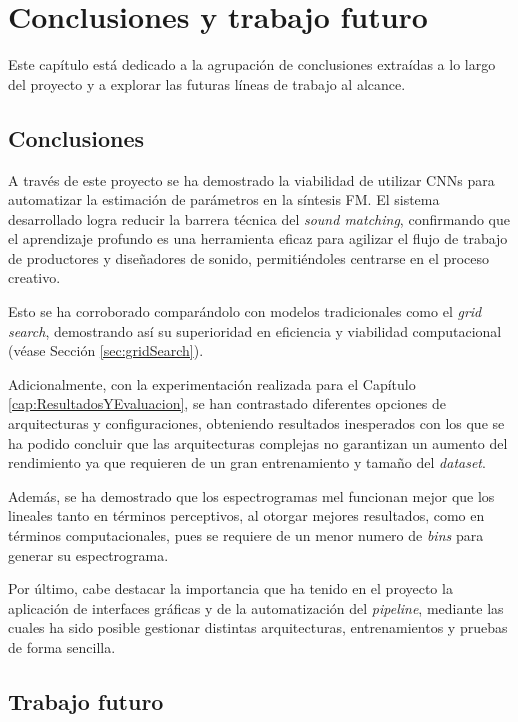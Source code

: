\chapter{Conclusiones y trabajo futuro}
\label{cap:conclusiones}

Este capítulo está dedicado a la agrupación de conclusiones extraídas a lo largo del proyecto y a explorar las futuras líneas de trabajo al alcance. 

\section{Conclusiones}

A través de este proyecto se ha demostrado la viabilidad de utilizar CNNs para automatizar la estimación de parámetros en la síntesis FM. El sistema desarrollado logra reducir la barrera técnica del \textit{sound matching}, confirmando que el aprendizaje profundo es una herramienta eficaz para agilizar el flujo de trabajo de productores y diseñadores de sonido, permitiéndoles centrarse en el proceso creativo. 

Esto se ha corroborado comparándolo con modelos tradicionales como el \textit{grid search}, demostrando así su superioridad en eficiencia y viabilidad computacional (véase Sección \ref{sec:gridSearch}).

Adicionalmente, con la experimentación realizada para el Capítulo \ref{cap:ResultadosYEvaluacion}, se han contrastado diferentes opciones de arquitecturas y configuraciones, obteniendo resultados inesperados con los que se ha podido concluir que las arquitecturas complejas no garantizan un aumento del rendimiento ya que requieren de un gran entrenamiento y tamaño del \textit{dataset}.

Además, se ha demostrado que los espectrogramas mel funcionan mejor que los lineales tanto en términos perceptivos, al otorgar mejores resultados, como en términos computacionales, pues se requiere de un menor numero de \textit{bins} para generar su espectrograma.

Por último, cabe destacar la importancia que ha tenido en el proyecto la aplicación de interfaces gráficas y de la automatización del \textit{pipeline}, mediante las cuales ha sido posible gestionar distintas arquitecturas, entrenamientos y pruebas de forma sencilla. 

\section{Trabajo futuro}

